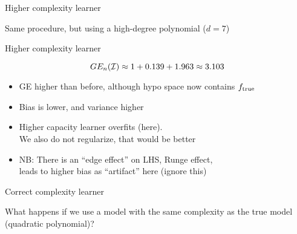 \documentclass[11pt,compress,t,notes=noshow, xcolor=table]{beamer}
\begin{document}
\begin{framei}[sep=M]{Higher complexity learner}

\item Same procedure, but using a high-degree polynomial ($d=7$)


\end{framei} 

\begin{frame}{Higher complexity learner}

\splitVThree
{}
{}
{}


$$GE_n(\mathcal{I}) \approx 1 + 0.139 + 1.963 \approx 3.103 $$

\vfill

\begin{itemize}
\item GE higher than before, although hypo space now contains $f_{\text{true}}$
\item Bias is lower, and variance higher 
\item Higher capacity learner overfits (here).\\
We also do not regularize, that would be better

\item NB: There is an ``edge effect'' on LHS, Runge effect,\\
leads to higher bias as ``artifact'' here (ignore this)
\end{itemize}

\end{frame}

\begin{framei}[sep=M]{Correct complexity learner}

\item What happens if we use a model with the same complexity as the true model (quadratic polynomial)? 


\end{framei}
\end{document}
